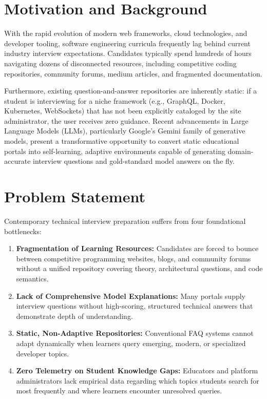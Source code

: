 \documentclass[12pt,a4paper]{report}
\begin{document}
\section{Motivation and Background}
With the rapid evolution of modern web frameworks, cloud technologies, and developer tooling, software engineering curricula frequently lag behind current industry interview expectations. Candidates typically spend hundreds of hours navigating dozens of disconnected resources, including competitive coding repositories, community forums, medium articles, and fragmented documentation. 

Furthermore, existing question-and-answer repositories are inherently static: if a student is interviewing for a niche framework (e.g., GraphQL, Docker, Kubernetes, WebSockets) that has not been explicitly cataloged by the site administrator, the user receives zero guidance. Recent advancements in Large Language Models (LLMs), particularly Google's Gemini family of generative models, present a transformative opportunity to convert static educational portals into self-learning, adaptive environments capable of generating domain-accurate interview questions and gold-standard model answers on the fly.

\section{Problem Statement}
Contemporary technical interview preparation suffers from four foundational bottlenecks:
\begin{enumerate}
    \item \textbf{Fragmentation of Learning Resources:} Candidates are forced to bounce between competitive programming websites, blogs, and community forums without a unified repository covering theory, architectural questions, and code semantics.
    \item \textbf{Lack of Comprehensive Model Explanations:} Many portals supply interview questions without high-scoring, structured technical answers that demonstrate depth of understanding.
    \item \textbf{Static, Non-Adaptive Repositories:} Conventional FAQ systems cannot adapt dynamically when learners query emerging, modern, or specialized developer topics.
    \item \textbf{Zero Telemetry on Student Knowledge Gaps:} Educators and platform administrators lack empirical data regarding which topics students search for most frequently and where learners encounter unresolved queries.
\end{enumerate}
\end{document}
